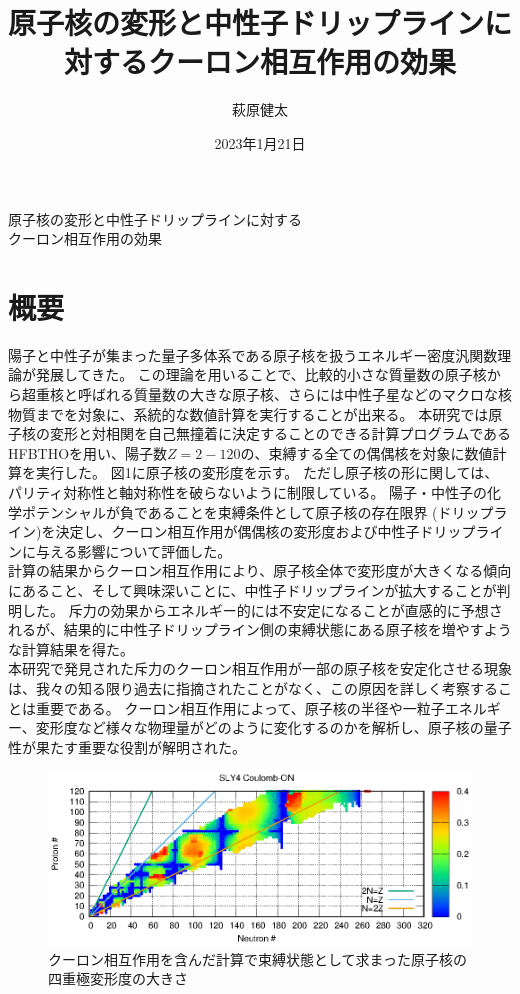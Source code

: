 \documentclass[10pt]{jarticle}
\title{原子核の変形と中性子ドリップラインに対するクーロン相互作用の効果}
\author{萩原健太}
\date{2023年1月21日}
\begin{document}
\begin{center}
  {\Large
    原子核の変形と中性子ドリップラインに対する\\
    クーロン相互作用の効果
  }
\end{center}


\section*{概要}
陽子と中性子が集まった量子多体系である原子核を扱うエネルギー密度汎関数理論が発展してきた。
この理論を用いることで、比較的小さな質量数の原子核から超重核と呼ばれる質量数の大きな原子核、さらには中性子星などのマクロな核物質までを対象に、系統的な数値計算を実行することが出来る。
本研究では原子核の変形と対相関を自己無撞着に決定することのできる計算プログラムであるHFBTHOを用い、陽子数$Z=2-120$の、束縛する全ての偶偶核を対象に数値計算を実行した。
図1に原子核の変形度を示す。
ただし原子核の形に関しては、パリティ対称性と軸対称性を破らないように制限している。
陽子・中性子の化学ポテンシャルが負であることを束縛条件として原子核の存在限界 (ドリップライン)を決定し、クーロン相互作用が偶偶核の変形度および中性子ドリップラインに与える影響について評価した。\\
計算の結果からクーロン相互作用により、原子核全体で変形度が大きくなる傾向にあること、そして興味深いことに、中性子ドリップラインが拡大することが判明した。
斥力の効果からエネルギー的には不安定になることが直感的に予想されるが、結果的に中性子ドリップライン側の束縛状態にある原子核を増やすような計算結果を得た。\\
本研究で発見された斥力のクーロン相互作用が一部の原子核を安定化させる現象は、我々の知る限り過去に指摘されたことがなく、この原因を詳しく考察することは重要である。
クーロン相互作用によって、原子核の半径や一粒子エネルギー、変形度など様々な物理量がどのように変化するのかを解析し、原子核の量子性が果たす重要な役割が解明された。
\begin{figure}[H]
  \centering
  \includegraphics{../SLY4_ON.eps}
  \setlength\floatsep{0pt}
  \setlength\intextsep{0pt} 
  \setlength\textfloatsep{0pt}
  \caption{クーロン相互作用を含んだ計算で束縛状態として求まった原子核の四重極変形度の大きさ}\label{fig:SLY4_deformation}
\end{figure}
\end{document}
